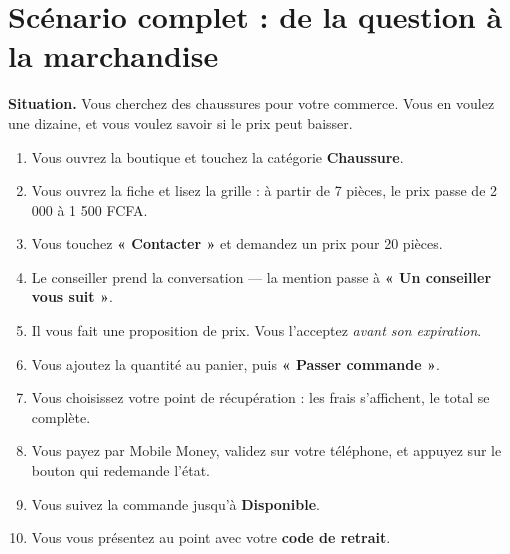 \documentclass[11pt,a4paper]{report}
\begin{document}
\section{Scénario complet : de la question à la marchandise}

\begin{tcolorbox}[colback=garahFond,colframe=garahEncre,arc=4pt,boxrule=1pt]
\textbf{Situation.} Vous cherchez des chaussures pour votre commerce. Vous en
voulez une dizaine, et vous voulez savoir si le prix peut baisser.
\end{tcolorbox}

\begin{enumerate}[leftmargin=*,itemsep=4pt]
  \item Vous ouvrez la boutique et touchez la catégorie \textbf{Chaussure}.
  \item Vous ouvrez la fiche et lisez la grille : à partir de 7 pièces, le prix
        passe de 2 000 à 1 500 FCFA.
  \item Vous touchez \textbf{« Contacter »} et demandez un prix pour 20 pièces.
  \item Le conseiller prend la conversation — la mention passe à
        \textbf{« Un conseiller vous suit »}.
  \item Il vous fait une proposition de prix. Vous l'acceptez \emph{avant son
        expiration}.
  \item Vous ajoutez la quantité au panier, puis \textbf{« Passer commande »}.
  \item Vous choisissez votre point de récupération : les frais s'affichent, le
        total se complète.
  \item Vous payez par Mobile Money, validez sur votre téléphone, et appuyez sur
        le bouton qui redemande l'état.
  \item Vous suivez la commande jusqu'à \textbf{Disponible}.
  \item Vous vous présentez au point avec votre \textbf{code de retrait}.
\end{enumerate}
\end{document}
